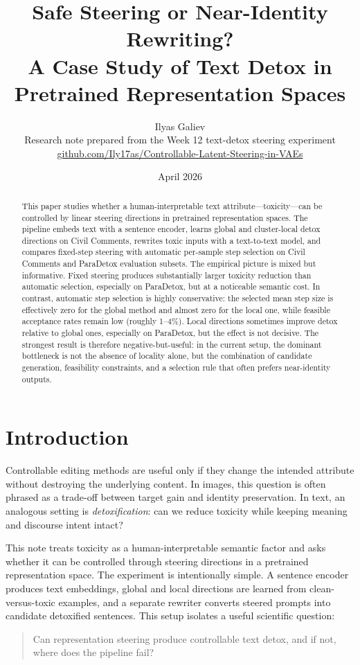 \documentclass[10pt,twocolumn]{article}
\title{\vspace{-1.2em}\bfseries Safe Steering or Near-Identity Rewriting?\\
\vspace{0.25em}\large A Case Study of Text Detox in Pretrained Representation Spaces}
\author{Ilyas Galiev\\
\small Research note prepared from the Week 12 text-detox steering experiment\\
\small\href{https://github.com/Ily17as/Controllable-Latent-Steering-in-VAEs}{github.com/Ily17as/Controllable-Latent-Steering-in-VAEs}}
\date{April 2026}
\begin{document}
\maketitle

\begin{abstract}
This paper studies whether a human-interpretable text attribute---toxicity---can be controlled by linear steering directions in pretrained representation spaces. The pipeline embeds text with a sentence encoder, learns global and cluster-local detox directions on Civil Comments, rewrites toxic inputs with a text-to-text model, and compares fixed-step steering with automatic per-sample step selection on Civil Comments and ParaDetox evaluation subsets. The empirical picture is mixed but informative. Fixed steering produces substantially larger toxicity reduction than automatic selection, especially on ParaDetox, but at a noticeable semantic cost. In contrast, automatic step selection is highly conservative: the selected mean step size is effectively zero for the global method and almost zero for the local one, while feasible acceptance rates remain low (roughly 1--4\%). Local directions sometimes improve detox relative to global ones, especially on ParaDetox, but the effect is not decisive. The strongest result is therefore negative-but-useful: in the current setup, the dominant bottleneck is not the absence of locality alone, but the combination of candidate generation, feasibility constraints, and a selection rule that often prefers near-identity outputs.
\end{abstract}

\section{Introduction}
Controllable editing methods are useful only if they change the intended attribute without destroying the underlying content. In images, this question is often phrased as a trade-off between target gain and identity preservation. In text, an analogous setting is \emph{detoxification}: can we reduce toxicity while keeping meaning and discourse intent intact?

This note treats toxicity as a human-interpretable semantic factor and asks whether it can be controlled through steering directions in a pretrained representation space. The experiment is intentionally simple. A sentence encoder produces text embeddings, global and local directions are learned from clean-versus-toxic examples, and a separate rewriter converts steered prompts into candidate detoxified sentences. This setup isolates a useful scientific question:
\begin{quote}
Can representation steering produce controllable text detox, and if not, where does the pipeline fail?
\end{quote}
\end{document}
